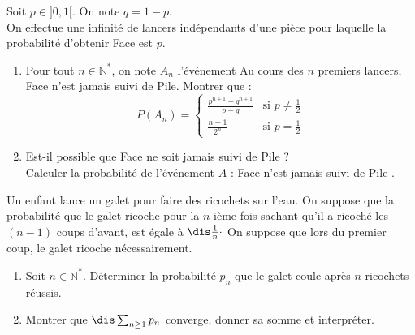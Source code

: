 \documentclass[a4paper,10pt]{report}
\begin{document}
\begin{Exa}
Soit $p \in ]0,1[$. On note $q=1-p$.\\
On effectue une infinité de lancers indépendants d'une pièce pour laquelle la probabilité d'obtenir Face est $p$.
\begin{enumerate}
\item Pour tout $n \in \mathbb{N}^*$, on note $A_n$ l'événement \og Au cours des $n$ premiers lancers, Face n'est jamais suivi de Pile\fg.
Montrer que :
$$P(A_n)=\begin{cases}
{\frac{p^{n+1}-q^{n+1}}{p-q}} & \text{si } p \neq \frac 1 2\\
{\frac{n+1}{2^n}} & \text{si } p=\frac 1 2
\end{cases}$$
\item Est-il possible que Face ne soit jamais suivi de Pile ?\\
Calculer la probabilité de l'événement $A$ : \og Face n'est jamais suivi de Pile \fg.
\end{enumerate}
\end{Exa}



\begin{Exa} Un enfant lance un galet pour faire des ricochets sur l'eau. On suppose que la probabilité que le galet ricoche pour la $n$-ième fois sachant qu'il a ricoché les $(n-1)$ coups d'avant, est égale à $\dis \frac{1}{n}\cdot$ On suppose que lors du premier coup, le galet ricoche nécessairement.
\begin{enumerate}
\item Soit $n \in \mathbb{N}^*$. Déterminer la probabilité $p_n$ que le galet coule après $n$ ricochets réussis.
\item Montrer que $\dis \sum_{n \geq 1} p_n$ converge, donner sa somme et interpréter.
\end{enumerate}
\end{Exa}
\end{document}
